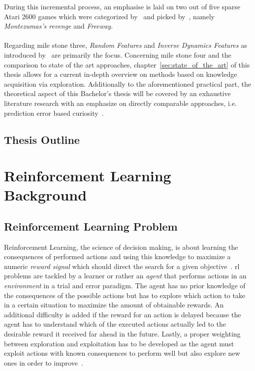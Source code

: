 \documentclass[draft,final]{vutinfth} %
\begin{document}
    During this incremental process, an emphasise is laid on two out of five sparse Atari 2600 games which were categorized by~\cite{bellemare_unifying_2016} and picked by~\citeauthor{burda_large-scale_2018-1}, namely \textit{Montezumas's revenge} and \textit{Freeway}.
    \\\\
    Regarding mile stone three, \textit{Random Features} and \textit{Inverse Dynamics Features} as introduced by~\citeauthor{burda_large-scale_2018-1} are primarily the focus.
    Concerning mile stone four and the comparison to state of the art approaches, chapter~\ref{sec:state_of_the_art} of this thesis allows for a current in-depth overview on methods based on knowledge acquisition via exploration.
    Additionally to the aforementioned practical part, the theoretical aspect of this Bachelor's thesis will be covered by an exhaustive literature research with an emphasize on directly comparable approaches, i.e. prediction error based curiosity~\citep{burda_large-scale_2018-1}.


    \section{Thesis Outline}\label{sec:thesis-outline}


    \glsresetall


    \chapter{Reinforcement Learning Background}\label{ch:reinforcement-learning-background}



    \section{Reinforcement Learning Problem}\label{sec:reinforcement-learning-problem}
    Reinforcement Learning, the science of decision making, is about learning the consequences of performed actions and using this knowledge to maximize a numeric \textit{reward signal} which should direct the search for a given objective~\citep{sutton_reinforcement_2018}.
    \gls{rl} problems are tackled by a learner or rather an \textit{agent} that performs actions in an \textit{environment} in a trial and error paradigm.
    The agent has no prior knowledge of the consequences of the possible actions but has to explore which action to take in a certain situation to maximize the amount of obtainable rewards.
    An additional difficulty is added if the reward for an action is delayed because the agent has to understand which of the executed actions actually led to the desirable reward it received far ahead in the future.
    Lastly, a proper weighting between exploration and exploitation has to be developed as the agent must exploit actions with known consequences to perform well but also explore new ones in order to improve~\citep{kaelbling_reinforcement_1996}.
\end{document}
